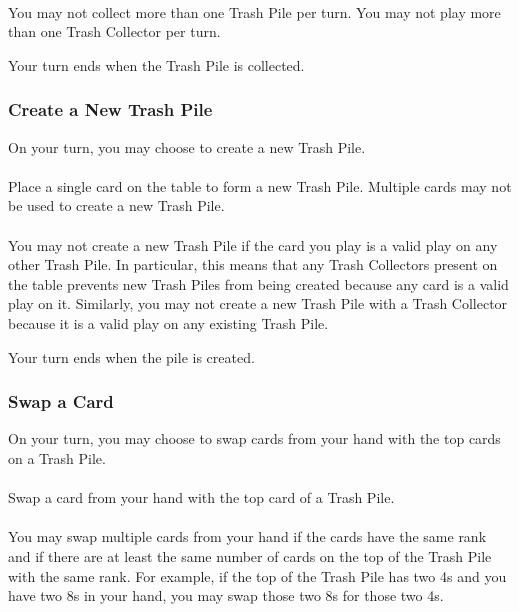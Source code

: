 \documentclass{article}
\begin{document}
\paragraph{} \label{par:collectsingle}
You may not collect more than one Trash Pile per turn. You may not play more than one Trash Collector per turn.

Your turn ends when the Trash Pile is collected.

\subsubsection{Create a New Trash Pile}
\label{sec:createtrashpile}

On your turn, you may choose to create a new Trash Pile.

\paragraph{} \label{par:createcreate}
Place a single card on the table to form a new Trash Pile. Multiple cards may not be used to create a new Trash Pile.

\paragraph{} \label{par:createrestriction}
You may not create a new Trash Pile if the card you play is a valid play on any other Trash Pile. In particular, this means that any Trash Collectors present on the table prevents new Trash Piles from being created because any card is a valid play on it. Similarly, you may not create a new Trash Pile with a Trash Collector because it is a valid play on any existing Trash Pile.

Your turn ends when the pile is created.

\subsubsection{Swap a Card}
\label{sec:swap}

On your turn, you may choose to swap cards from your hand with the top cards on a Trash Pile.

\paragraph{} \label{par:swaptop}
Swap a card from your hand with the top card of a Trash Pile.

\paragraph{} \label{par:swapmultiple}
You may swap multiple cards from your hand if the cards have the same rank and if there are at least the same number of cards on the top of the Trash Pile with the same rank. For example, if the top of the Trash Pile has two 4s and you have two 8s in your hand, you may swap those two 8s for those two 4s.
\end{document}
